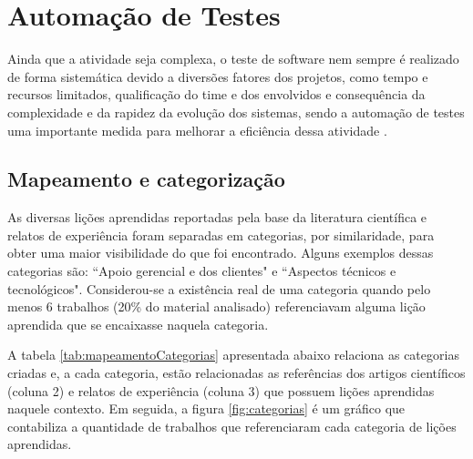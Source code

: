 \chapter{Automação de Testes}

Ainda que a atividade seja complexa, o teste de software nem sempre é realizado de forma sistemática devido a diversões fatores dos projetos, como tempo e recursos limitados, qualificação do time e dos envolvidos e consequência da complexidade e da rapidez da evolução dos sistemas, sendo a automação de testes uma importante medida para melhorar a eficiência dessa atividade \cite{Fantinato2004}.

\section{Mapeamento e categorização}

As diversas lições aprendidas reportadas pela base da literatura científica e relatos de experiência foram separadas em categorias, por similaridade, para obter uma maior visibilidade do que foi encontrado. Alguns exemplos dessas categorias são: ``Apoio gerencial e dos clientes" e ``Aspectos técnicos e tecnológicos". Considerou-se a existência real de uma categoria quando pelo menos 6 trabalhos (20\% do material analisado) referenciavam alguma lição aprendida que se encaixasse naquela categoria.

A tabela \ref{tab:mapeamentoCategorias} apresentada abaixo relaciona as categorias criadas e, a cada categoria, estão relacionadas as referências dos artigos científicos (coluna 2) e relatos de experiência (coluna 3) que possuem lições aprendidas naquele contexto. Em seguida, a figura \ref{fig:categorias} é um gráfico que contabiliza a quantidade de trabalhos que referenciaram cada categoria de lições aprendidas.

